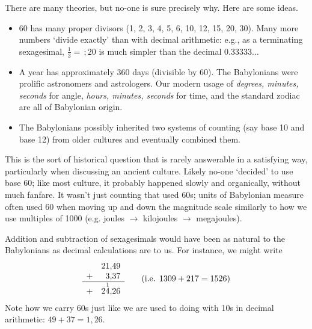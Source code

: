 
There are many theories, but no-one is sure precisely why. Here are some ideas.
\begin{itemize}
  \item 60 has many proper divisors (1, 2, 3, 4, 5, 6, 10, 12, 15, 20, 30). Many more numbers `divide exactly' than with decimal arithmetic: e.g., as a terminating sexagesimal, $\frac 13=\,;20$ is much simpler than the decimal $0.33333\ldots$
  \item A year has approximately 360 days (divisible by 60). The Babylonians were prolific astronomers and astrologers. Our modern usage of \emph{degrees, minutes, seconds} for angle, \emph{hours, minutes, seconds} for time, and the standard zodiac are all of Babylonian origin.
  \item The Babylonians possibly inherited two systems of counting (say base 10 and base 12) from older cultures and eventually combined them.
\end{itemize}
This is the sort of historical question that is rarely answerable in a satisfying way, particularly when discussing an ancient culture. Likely no-one `decided' to use base 60; like most culture, it probably happened slowly and organically, without much fanfare.\smallbreak
It wasn't just counting that used 60s; units of Babylonian measure often used 60 when moving up and down the magnitude scale similarly to how we use multiples of 1000 (e.g.{} joules $\rightarrow$ kilojoules $\rightarrow$ megajoules). 


\label{babmult}

Addition and subtraction of sexagesimals would have been as natural to the Babylonians as decimal calculations are to us. For instance, we might write
\[\begin{array}{rr@{,}r}
&21&49\\
+&3&37\\\hline
+&2\overset{1}{4}&26\\
\end{array} \tag{i.e.{} $1309+217=1526$}\]
Note how we carry 60s just like we are used to doing with 10s in decimal arithmetic: $49+37=1,26$.\smallbreak

